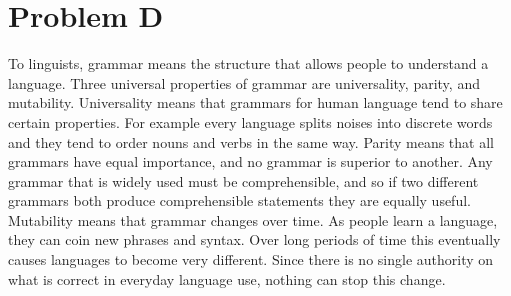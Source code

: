 \documentclass[12pt]{article}
\begin{document}
\section*{Problem D}

To linguists, grammar means the structure that allows people to understand a language. Three universal properties of grammar are universality,
parity, and mutability. Universality means that grammars for human language tend to share certain properties.
For example every language splits noises into discrete words and they tend to order nouns and verbs in the same way.
Parity means that all grammars have equal importance, and no grammar is superior to another. Any grammar that is widely used must be comprehensible,
and so if two different grammars both produce comprehensible statements they are equally useful. Mutability means that grammar changes over time.
As people learn a language, they can coin new phrases and syntax. Over long periods of time this eventually causes languages to become very different.
Since there is no single authority on what is correct in everyday language use, nothing can stop this change.
\end{document}
